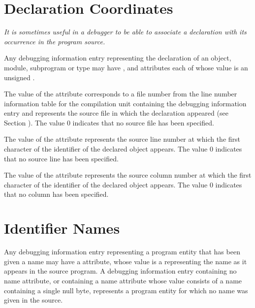 \section{Declaration Coordinates}
\label{chap:declarationcoordinates}
\textit{It is sometimes useful in a debugger to be able to associate
a declaration with its occurrence in the program source.}

Any debugging information 
\hypertarget{chap:DWATdeclfilefilecontainingsourcedeclaration}{}
entry 
\hypertarget{chap:DWATdecllinelinenumberofsourcedeclaration}{}
representing 
\hypertarget{chap:DWATdeclcolumncolumnpositionofsourcedeclaration}{}
the
declaration of an object, module, subprogram or
type 
may 
have
\DWATdeclfile, 
\DWATdeclline{} and 
\DWATdeclcolumn{}
attributes each of whose value is an unsigned
.

The value of 
the 
\DWATdeclfile{}
attribute 
corresponds to
a file number from the line number information table for the
compilation unit containing the debugging information entry and
represents the source file in which the declaration appeared
(see Section ). 
The value 0 indicates that no source file
has been specified.

The value of 
the \DWATdeclline{} attribute represents
the source line number at which the first character of
the identifier of the declared object appears. The value 0
indicates that no source line has been specified.

The value of 
the \DWATdeclcolumn{} attribute represents
the source column number at which the first character of
the identifier of the declared object appears. The value 0
indicates that no column has been specified.

\section{Identifier Names}
\label{chap:identifiernames}
Any 
\hypertarget{chap:DWATnamenameofdeclaration}{}
debugging information entry 
representing 
a program entity
that has been given a name may have a 
\DWATname{} attribute,
whose 
value is a  
representing the name as it appears in
the source program. A debugging information entry containing
no name attribute, or containing a name attribute whose value
consists of a name containing a single null byte, represents
a program entity for which no name was given in the source.

